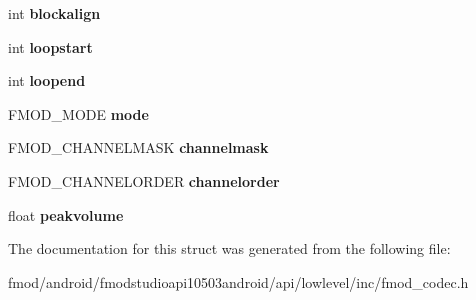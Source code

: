 \begin{DoxyCompactItemize}
\item 
\hypertarget{struct_f_m_o_d___c_o_d_e_c___w_a_v_e_f_o_r_m_a_t_a46df2a2789c6c438cd773762ed397a6f}{int {\bfseries blockalign}}\label{struct_f_m_o_d___c_o_d_e_c___w_a_v_e_f_o_r_m_a_t_a46df2a2789c6c438cd773762ed397a6f}

\item 
\hypertarget{struct_f_m_o_d___c_o_d_e_c___w_a_v_e_f_o_r_m_a_t_ae795e36327ba4772301f09501b2a8cc0}{int {\bfseries loopstart}}\label{struct_f_m_o_d___c_o_d_e_c___w_a_v_e_f_o_r_m_a_t_ae795e36327ba4772301f09501b2a8cc0}

\item 
\hypertarget{struct_f_m_o_d___c_o_d_e_c___w_a_v_e_f_o_r_m_a_t_af6fe45ead433ef4bdb8d3e74859900f2}{int {\bfseries loopend}}\label{struct_f_m_o_d___c_o_d_e_c___w_a_v_e_f_o_r_m_a_t_af6fe45ead433ef4bdb8d3e74859900f2}

\item 
\hypertarget{struct_f_m_o_d___c_o_d_e_c___w_a_v_e_f_o_r_m_a_t_a1f23ba212c380e08e9d0b83f16a00320}{F\+M\+O\+D\+\_\+\+M\+O\+D\+E {\bfseries mode}}\label{struct_f_m_o_d___c_o_d_e_c___w_a_v_e_f_o_r_m_a_t_a1f23ba212c380e08e9d0b83f16a00320}

\item 
\hypertarget{struct_f_m_o_d___c_o_d_e_c___w_a_v_e_f_o_r_m_a_t_a5ef3ccd8b66efab89177fb7f02de8a3e}{F\+M\+O\+D\+\_\+\+C\+H\+A\+N\+N\+E\+L\+M\+A\+S\+K {\bfseries channelmask}}\label{struct_f_m_o_d___c_o_d_e_c___w_a_v_e_f_o_r_m_a_t_a5ef3ccd8b66efab89177fb7f02de8a3e}

\item 
\hypertarget{struct_f_m_o_d___c_o_d_e_c___w_a_v_e_f_o_r_m_a_t_a95f5ba661ea00c1a6ab06092f9bc9fac}{F\+M\+O\+D\+\_\+\+C\+H\+A\+N\+N\+E\+L\+O\+R\+D\+E\+R {\bfseries channelorder}}\label{struct_f_m_o_d___c_o_d_e_c___w_a_v_e_f_o_r_m_a_t_a95f5ba661ea00c1a6ab06092f9bc9fac}

\item 
\hypertarget{struct_f_m_o_d___c_o_d_e_c___w_a_v_e_f_o_r_m_a_t_a4bf4a9aeb4628e4eec7ff239453bb4e7}{float {\bfseries peakvolume}}\label{struct_f_m_o_d___c_o_d_e_c___w_a_v_e_f_o_r_m_a_t_a4bf4a9aeb4628e4eec7ff239453bb4e7}

\end{DoxyCompactItemize}


The documentation for this struct was generated from the following file\+:\begin{DoxyCompactItemize}
\item 
fmod/android/fmodstudioapi10503android/api/lowlevel/inc/fmod\+\_\+codec.\+h\end{DoxyCompactItemize}
